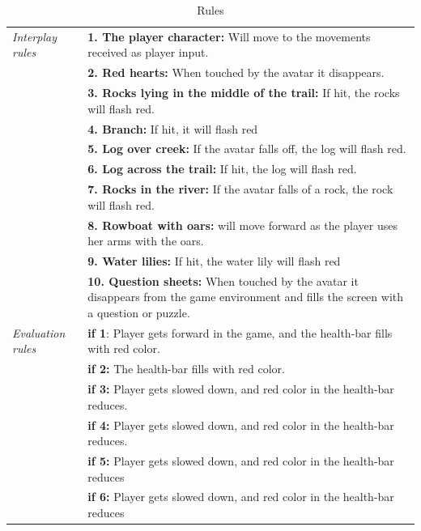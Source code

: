 \begin{table} [H]
\centering
\begin{tabular}{|p{}|p{}|}
\hline
\emph{Interplay rules} & \textbf{1. The player character:} Will move to the movements received as player input. \\ \cline{2-2}
&  \textbf{2. Red hearts:} When touched by the avatar it disappears. \\ \cline{2-2}
& \textbf{3. Rocks lying in the middle of the trail:} If hit, the  rocks will flash red.  \\ \cline{2-2}
&  \textbf{4. Branch:} If hit, it will flash red \\ \cline{2-2}
& \textbf{5. Log over creek:} If the avatar falls off, the log will flash red. \\ \cline{2-2}
& \textbf{6. Log across the trail:} If hit, the log will flash red.  \\ \cline{2-2}
& \textbf{7. Rocks in the river:} If the avatar falls of a rock, the rock will flash red.  \\ \cline{2-2}
& \textbf{8. Rowboat with oars:} will move forward as the player  uses her arms with the oars. \\ \cline{2-2}
& \textbf{9. Water lilies:} If hit, the water lily will flash red \\ \cline{2-2}
&  \textbf{10. Question sheets:} When touched by the avatar  it  disappears from the game environment and fills the screen with  a  question or puzzle. \\ \hline
\emph{Evaluation rules} & \textbf{if 1}: Player gets forward in the game, and the health-bar fills with red color. \\ \cline{2-2}
& \textbf{if 2:} The health-bar fills with red color.  \\ \cline{2-2}
& \textbf{if 3:} Player gets slowed down, and red color in the health-bar reduces.   \\ \cline{2-2}
& \textbf{if 4:} Player gets slowed down, and red color in the health-bar reduces.  \\ \cline{2-2}
& \textbf{if 5:} Player gets slowed down, and red color in the health-bar reduces   \\ \cline{2-2}
& \textbf{if 6:} Player gets slowed down, and red color in the health-bar reduces   \\ \hline
\end{tabular}
\caption[Rules in the "Nature Trail" game]{Rules}
\label{tab:rules1}
\end{table} 

